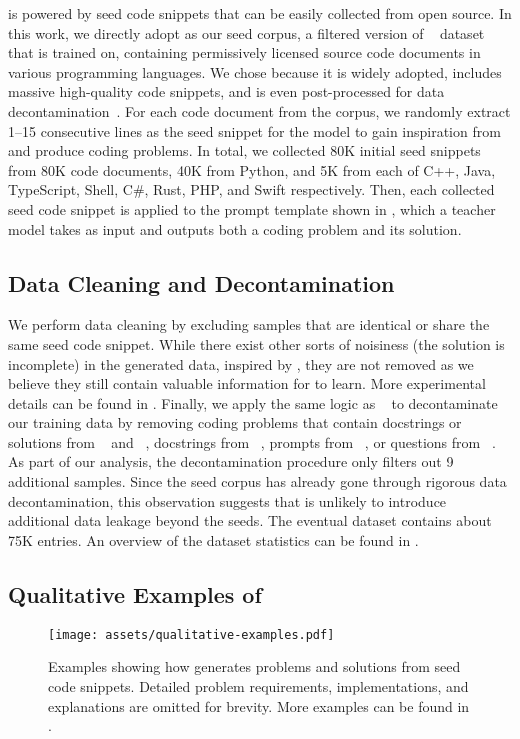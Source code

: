 \tech{} is powered by seed code snippets that can be easily collected from open source.
In this work, we directly adopt \seedcorpus{} as our seed corpus, a filtered version of \thestack{}~\cite{thestack} dataset that \starcoder{} is trained on, containing permissively licensed source code documents in various programming languages.
We chose \seedcorpus{} because it is widely adopted, includes massive high-quality code snippets, and is even post-processed for data decontamination~\cite{starcoder, santacoder}.
For each code document from the corpus, we randomly extract 1--15 consecutive lines as the seed snippet for the model to gain inspiration from and produce coding problems. In total, we collected 80K initial seed snippets from 80K code documents, 40K from Python, and 5K from each of C++, Java, TypeScript, Shell, C\#, Rust, PHP, and Swift respectively.
Then, each collected seed code snippet is applied to the prompt template shown in , which a teacher model takes as input and outputs both a coding problem and its solution.

\subsection{Data Cleaning and Decontamination}
\label{sec:tech:decontaminate}

We perform data cleaning by excluding samples that are identical or share the same seed code snippet.
While there exist other sorts of noisiness (\eg the solution is incomplete)
in the generated data, inspired by \citet{unnatural}, they are not removed as we believe they still contain valuable information for  to learn.
More experimental details can be found in .
Finally, we apply the same logic as \starcoder~\citet{starcoder} to decontaminate our training data by removing coding problems that contain docstrings or solutions from \humaneval{}~\cite{codex} and \mbpp{}~\cite{synthesisllm}, docstrings from \apps{}~\cite{apps}, prompts from \dsonek{}~\cite{ds1000}, or questions from \gsm{}~\cite{gsm8k}.
As part of our analysis, the decontamination procedure only filters out 9 additional samples. Since the seed corpus \seedcorpus{} has already gone through rigorous data decontamination, this observation suggests that \tech{} is unlikely to introduce additional data leakage beyond the seeds.
The eventual \tech{} dataset contains about 75K entries.
{An overview of the dataset statistics can be found in .}

\subsection{Qualitative Examples of \tech{}}
\begin{figure*}
\centering
\texttt{[image: assets/qualitative-examples.pdf]}
\caption{Examples showing how \tech{} generates problems and solutions from seed code snippets. Detailed problem requirements, implementations, and explanations are omitted for brevity. More examples can be found in .}
\label{fig:examples}
\end{figure*}

